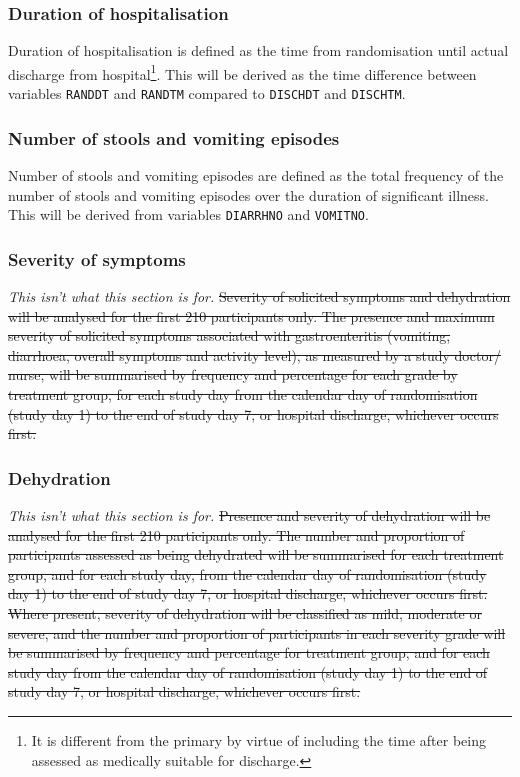 \documentclass[a4paper]{article}
\begin{document}
\subsubsection{Duration of hospitalisation}

Duration of hospitalisation is defined as the time from randomisation until actual discharge from hospital\footnote{It is different from the primary by virtue of including the time after being assessed as medically suitable for discharge.}.
This will be derived as the time difference between variables \texttt{RANDDT} and \texttt{RANDTM} compared to \texttt{DISCHDT} and \texttt{DISCHTM}.

\subsubsection{Number of stools and vomiting episodes}

Number of stools and vomiting episodes are defined as the total frequency of the number of stools and vomiting episodes over the duration of significant illness.
This will be derived from variables \texttt{DIARRHNO} and \texttt{VOMITNO}.

\subsubsection{Severity of symptoms} 

\textit{This isn't what this section is for.}
\st{Severity of solicited symptoms and dehydration will be analysed for the first 210 participants only.
The presence and maximum severity of solicited symptoms associated with gastroenteritis (vomiting, diarrhoea, overall symptoms and activity level), as measured by a study doctor/ nurse, will be summarised by frequency and percentage for each grade by treatment group, for each study day from the calendar day of randomisation (study day 1) to the end of study day 7, or hospital discharge, whichever occurs first.}

\subsubsection{Dehydration} 

\textit{This isn't what this section is for.}
\st{Presence and severity of dehydration will be analysed for the first 210 participants only.
The number and proportion of participants assessed as being dehydrated will be summarised for each treatment group, and for each study day, from the calendar day of randomisation (study day 1) to the end of study day 7, or hospital discharge, whichever occurs first.
Where present, severity of dehydration will be classified as mild, moderate or severe, and the number and proportion of participants in each severity grade will be summarised by frequency and percentage for treatment group, and for each study day from the calendar day of randomisation (study day 1) to the end of study day 7, or hospital discharge, whichever occurs first.}
\end{document}
